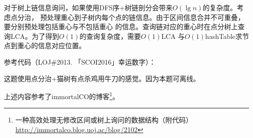 对于树上链信息询问，如果使用DFS序+树链剖分会带来$O(\lg n)$的复杂度。考虑点分治，
预处理重心到子树内每个点的链信息。由于区间信息合并不可重叠，要分别预处理包括重心与不包括重心
的信息。查询链对应的重心时在点分树上查询LCA。为了得到$O(1)$的查询复杂度，需要$O(1)$LCA
与$O(1)$hashTable求节点到重心的信息对应位置。

参考代码（LOJ\#2013. 「SCOI2016」幸运数字）：

这题使用点分治+猫树有点杀鸡用牛刀的感觉。因为本题可离线。



上述内容参考了immortalCO的博客\footnote{
    一种高效处理无修改区间或树上询问的数据结构（附代码）
    \url{http://immortalco.blog.uoj.ac/blog/2102}
}。
